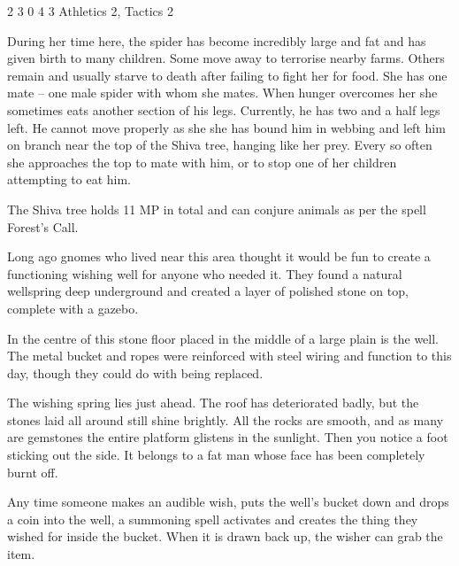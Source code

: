 \begin{multicols}{2}
{2}%
{3}%
{0}%
{4}%
{3}%
{Athletics 2, Tactics 2}%
{\web}%
{}

During her time here, the spider has become incredibly large and fat and has given birth to many children.
Some move away to terrorise nearby farms.
Others remain and usually starve to death after failing to fight her for food.
She has one mate -- one male spider with whom she mates.
When hunger overcomes her she sometimes eats another section of his legs.
Currently, he has two and a half legs left.
He cannot move properly as she she has bound him in webbing and left him on branch near the top of the Shiva tree, hanging like her prey.
Every so often she approaches the top to mate with him, or to stop one of her children attempting to eat him.


\nuraspider

The Shiva tree holds 11 MP in total and can conjure animals as per the spell Forest's Call.


Long ago gnomes who lived near this area thought it would be fun to create a functioning wishing well for anyone who needed it.
They found a natural wellspring deep underground and created a layer of polished stone on top, complete with a gazebo.

In the centre of this stone floor placed in the middle of a large plain is the well.
The metal bucket and ropes were reinforced with steel wiring and function to this day, though they could do with being replaced.

\begin{boxtext}

  The wishing spring lies just ahead.
  The roof has deteriorated badly, but the stones laid all around still shine brightly.
  All the rocks are smooth, and as many are gemstones the entire platform glistens in the sunlight.
  Then you notice a foot sticking out the side.
  It belongs to a fat man whose face has been completely burnt off.

\end{boxtext}

Any time someone makes an audible wish, puts the well's bucket down and drops a coin into the well, a summoning spell activates and creates the thing they wished for inside the bucket.
When it is drawn back up, the wisher can grab the item.


\end{multicols}
